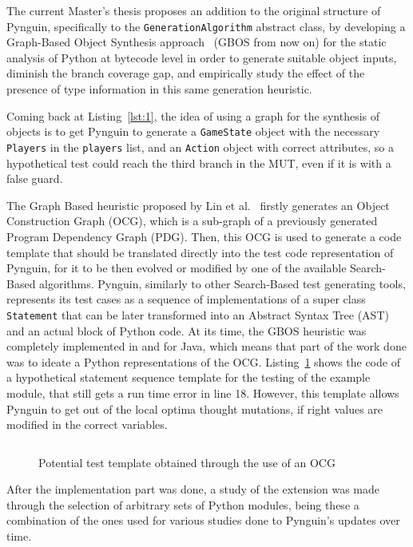 \documentclass[%
  chapterprefix=false,%
  open=right,%
  twoside=true,%
  paper=a4,%
  logofile={Figures/logo.png},%
  thesistype=master,%
  UKenglish,%
]{se2thesis}
\newcommand{\classname}[1]{\texttt{#1}}
\begin{document}
The current Master's thesis proposes an addition to the original structure of Pynguin, specifically to the \classname{GenerationAlgorithm} abstract class, by developing a Graph-Based Object Synthesis approach~\cite{DBLP:conf/sigsoft/0001O00D21} (GBOS from now on) for the static analysis of Python at bytecode level in order to generate suitable object inputs, diminish the branch coverage gap, and empirically study the effect of the presence of type information in this same generation heuristic.

Coming back at Listing~\ref{lst:1}, the idea of using a graph for the synthesis of objects is to get Pynguin to generate a \verb|GameState| object with the necessary \verb|Players| in the \verb|players| list, and an \verb|Action| object with correct attributes, so a hypothetical test could reach the third branch in the MUT, even if it is with a false guard.

The Graph Based heuristic proposed by Lin et al.~\cite{DBLP:conf/sigsoft/0001O00D21} firstly generates an Object Construction Graph (OCG), which is a sub-graph of a previously generated Program Dependency Graph (PDG).
Then, this OCG is used to generate a code template that should be translated directly into the test code representation of Pynguin, for it to be then evolved or modified by one of the available Search-Based algorithms.
Pynguin, similarly to other Search-Based test generating tools, represents its test cases as a sequence of implementations of a super class \classname{Statement} that can be later transformed into an Abstract Syntax Tree (AST) and an actual block of Python code.
At its time, the GBOS heuristic was completely implemented in and for Java, which means that part of the work done was to ideate a Python representations of the OCG.\@
Listing~\ref{lst:4} shows the code of a hypothetical statement sequence template for the testing of the example module, that still gets a run time error in line 18.
However, this template allows Pynguin to get out of the local optima thought mutations, if right values are modified in the correct variables.

\begin{figure}
  \inputminted[linenos]{python}{Figures/template.py}
  \caption{Potential test template obtained through the use of an OCG\label{lst:4}}
\end{figure}

After the implementation part was done, a study of the extension was made through the selection of arbitrary sets of Python modules, being these a combination of the ones used for various studies done to Pynguin's updates over time.
\end{document}
